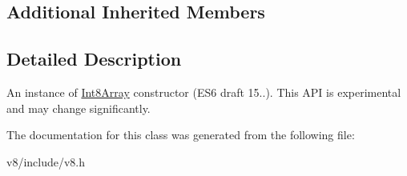 \subsection*{Additional Inherited Members}


\subsection{Detailed Description}
An instance of \hyperlink{classv8_1_1Int8Array}{Int8\+Array} constructor (E\+S6 draft 15..). This A\+PI is experimental and may change significantly. 

The documentation for this class was generated from the following file\+:\begin{DoxyCompactItemize}
\item 
v8/include/v8.\+h\end{DoxyCompactItemize}
